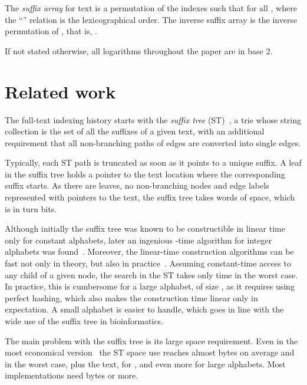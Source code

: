 \documentclass{cai}
\begin{document}
The {\em suffix array}  for text  is a permutation 
of the indexes  such that 
 for all , 
where the ``'' relation is the lexicographical order.
The inverse suffix array  is the inverse permutation of , 
that is, .

If not stated otherwise, all logarithms throughout the paper are in base 2.


\section{Related work}
\label{sec:rwork}

The full-text indexing history starts with the {\em suffix tree} 
(ST)~\cite{Wei73}, a trie whose string collection is the set of all the 
suffixes of a given text, with an additional requirement that all 
non-branching paths of edges are converted into single edges. 

Typically, each ST path is truncated as soon as it points to a unique suffix. 
A leaf in the suffix tree holds a pointer to the text location where the 
corresponding suffix starts.
As there are  leaves, no non-branching nodes and edge labels represented 
with pointers to the text, the suffix tree takes  words of space, 
which is in turn  bits.

Although initially the suffix tree was known to be constructible in 
linear time only for constant alphabets, 
later an ingenious -time algorithm for integer 
alphabets was found~\cite{Far97}.
Moreover, the linear-time construction algorithms can 
be fast not only in theory, but also in practice~\cite{Gri07}.
Assuming constant-time access to any child of a given node, 
the search in the ST takes only  time in the worst case.
In practice, this is cumbersome for a large alphabet, 
of size , 
as it requires using 
perfect hashing, which also makes the construction time linear only in expectation.
A small alphabet is easier to handle, which goes in line with the wide 
use of the suffix tree in bioinformatics.

The main problem with the suffix tree 
is its large space requirement.
Even in the most economical version~\cite{KB00} 
the ST space use 
reaches almost  bytes on average and  in the worst case, 
plus the text, for , and even more for large alphabets.
Most implementations need  bytes or more.
\end{document}
